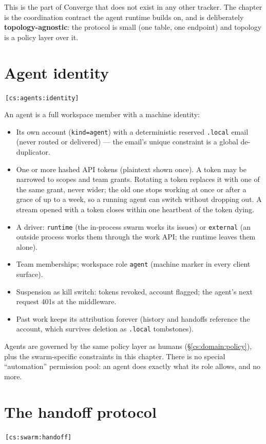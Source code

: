 \documentclass[11pt,a4paper]{report}
\newcommand{\cs}[1]{\,\texttt{\scriptsize[cs:#1]}\label{cs:#1}}
\begin{document}
This is the part of Converge that does not exist in any other tracker.
The chapter is the coordination contract the agent runtime builds on,
and is deliberately \textbf{topology-agnostic}: the protocol is small
(one table, one endpoint) and topology is a policy layer over it.

\section{Agent identity}
\label{sec:agents-identity}
\cs{agents:identity}

An agent is a full workspace member with a machine identity:

\begin{itemize}
\item Its own account (\texttt{kind=agent}) with a deterministic reserved
  \texttt{.local} email (never routed or delivered) --- the email's unique
  constraint is a global de-duplicator.
\item One or more hashed API tokens (plaintext shown once). A token may
  be narrowed to scopes and team grants. Rotating a token replaces it
  with one of the same grant, never wider; the old one stops working at
  once or after a grace of up to a week, so a running agent can switch
  without dropping out. A stream opened with a token closes within one
  heartbeat of the token dying.
\item A driver: \texttt{runtime} (the in-process swarm works its issues)
  or \texttt{external} (an outside process works them through the work
  API; the runtime leaves them alone).
\item Team memberships; workspace role \texttt{agent} (machine marker in
  every client surface).
\item Suspension as kill switch: tokens revoked, account flagged; the
  agent's next request 401s at the middleware.
\item Past work keeps its attribution forever (history and handoffs
  reference the account, which survives deletion as \texttt{.local}
  tombstones).
\end{itemize}

Agents are governed by the same policy layer as humans
(\S\ref{cs:domain:policy}), plus the swarm-specific constraints in this
chapter. There is no special ``automation'' permission pool: an agent
does exactly what its role allows, and no more.

\section{The handoff protocol}
\label{sec:handoff}
\cs{swarm:handoff}
\end{document}
